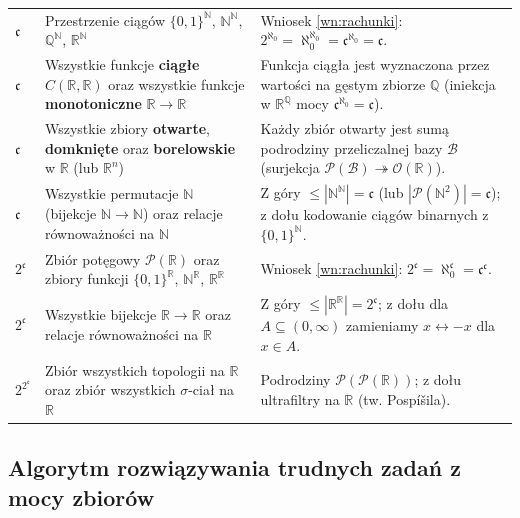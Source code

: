 \documentclass[11pt, a4paper]{article}
\theoremstyle{definition}
\theoremstyle{plain}
\theoremstyle{remark}
\begin{document}
\begin{center}
\begin{tabularx}{\textwidth}{l X X}
\addlinespace[3pt]
$\mathfrak{c}$ & Przestrzenie ciągów $\{0, 1\}^{\mathbb{N}}$, $\mathbb{N}^{\mathbb{N}}$, $\mathbb{Q}^{\mathbb{N}}$, $\mathbb{R}^{\mathbb{N}}$ & Wniosek \ref{wn:rachunki}: $2^{\aleph_0} = \aleph_0^{\aleph_0} = \mathfrak{c}^{\aleph_0} = \mathfrak{c}$. \\
\addlinespace[3pt]
$\mathfrak{c}$ & Wszystkie funkcje \textbf{ciągłe} $C(\mathbb{R}, \mathbb{R})$ oraz wszystkie funkcje \textbf{monotoniczne} $\mathbb{R} \to \mathbb{R}$ & Funkcja ciągła jest wyznaczona przez wartości na gęstym zbiorze $\mathbb{Q}$ (iniekcja w $\mathbb{R}^{\mathbb{Q}}$ mocy $\mathfrak{c}^{\aleph_0} = \mathfrak{c}$). \\
\addlinespace[3pt]
$\mathfrak{c}$ & Wszystkie zbiory \textbf{otwarte}, \textbf{domknięte} oraz \textbf{borelowskie} w $\mathbb{R}$ (lub $\mathbb{R}^n$) & Każdy zbiór otwarty jest sumą podrodziny przeliczalnej bazy $\mathcal{B}$ (surjekcja $\mathcal{P}(\mathcal{B}) \twoheadrightarrow \mathcal{O}(\mathbb{R})$). \\
\addlinespace[3pt]
$\mathfrak{c}$ & Wszystkie permutacje $\mathbb{N}$ (bijekcje $\mathbb{N} \to \mathbb{N}$) oraz relacje równoważności na $\mathbb{N}$ & Z góry $\le |\mathbb{N}^{\mathbb{N}}| = \mathfrak{c}$ (lub $|\mathcal{P}(\mathbb{N}^2)| = \mathfrak{c}$); z dołu kodowanie ciągów binarnych z $\{0, 1\}^{\mathbb{N}}$. \\
\midrule
$2^{\mathfrak{c}}$ & Zbiór potęgowy $\mathcal{P}(\mathbb{R})$ oraz zbiory funkcji $\{0, 1\}^{\mathbb{R}}$, $\mathbb{N}^{\mathbb{R}}$, $\mathbb{R}^{\mathbb{R}}$ & Wniosek \ref{wn:rachunki}: $2^{\mathfrak{c}} = \aleph_0^{\mathfrak{c}} = \mathfrak{c}^{\mathfrak{c}}$. \\
\addlinespace[3pt]
$2^{\mathfrak{c}}$ & Wszystkie bijekcje $\mathbb{R} \to \mathbb{R}$ oraz relacje równoważności na $\mathbb{R}$ & Z góry $\le |\mathbb{R}^{\mathbb{R}}| = 2^{\mathfrak{c}}$; z dołu dla $A \subseteq (0, \infty)$ zamieniamy $x \leftrightarrow -x$ dla $x \in A$. \\
\addlinespace[3pt]
$2^{2^{\mathfrak{c}}}$ & Zbiór wszystkich topologii na $\mathbb{R}$ oraz zbiór wszystkich $\sigma$-ciał na $\mathbb{R}$ & Podrodziny $\mathcal{P}(\mathcal{P}(\mathbb{R}))$; z dołu ultrafiltry na $\mathbb{R}$ (tw. Pospíšila). \\
\bottomrule
\end{tabularx}
\end{center}

\subsection{Algorytm rozwiązywania trudnych zadań z mocy zbiorów}
\end{document}
